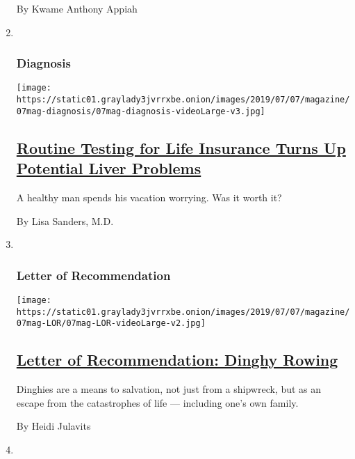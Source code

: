 \begin{enumerate}
  By Kwame Anthony Appiah
\item ~
  \hypertarget{diagnosis}{%
  \subsubsection{Diagnosis}\label{diagnosis}}

  \texttt{[image: https://static01.graylady3jvrrxbe.onion/images/2019/07/07/magazine/07mag-diagnosis/07mag-diagnosis-videoLarge-v3.jpg]}

  \hypertarget{routine-testing-for-life-insurance-turns-up-potential-liver-problems}{%
  \subsection{\texorpdfstring{\href{/2019/07/03/magazine/routine-testing-for-life-insurance-turns-up-potential-liver-problems.html}{Routine
  Testing for Life Insurance Turns Up Potential Liver
  Problems}}{Routine Testing for Life Insurance Turns Up Potential Liver Problems}}\label{routine-testing-for-life-insurance-turns-up-potential-liver-problems}}

  A healthy man spends his vacation worrying. Was it worth it?

  By Lisa Sanders, M.D.
\item ~
  \hypertarget{letter-of-recommendation}{%
  \subsubsection{Letter of
  Recommendation}\label{letter-of-recommendation}}

  \texttt{[image: https://static01.graylady3jvrrxbe.onion/images/2019/07/07/magazine/07mag-LOR/07mag-LOR-videoLarge-v2.jpg]}

  \hypertarget{letter-of-recommendation-dinghy-rowing}{%
  \subsection{\texorpdfstring{\href{/2019/07/03/magazine/letter-of-recommendation-dinghy-rowing.html}{Letter
  of Recommendation: Dinghy
  Rowing}}{Letter of Recommendation: Dinghy Rowing}}\label{letter-of-recommendation-dinghy-rowing}}

  Dinghies are a means to salvation, not just from a shipwreck, but as
  an escape from the catastrophes of life --- including one's own
  family.

  By Heidi Julavits
\item ~
  \hypertarget{eat}{%
}
\end{enumerate}

